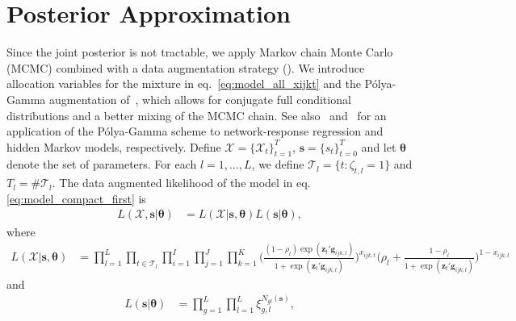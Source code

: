 \documentclass[12pt,a4paper]{article}
\theoremstyle{custom}
\begin{document}
\section{Posterior Approximation} \label{sec:posterior_approx}
Since the joint posterior is not tractable, we apply Markov chain Monte Carlo (MCMC) combined with a data augmentation strategy (\cite{Tanner87DataAugmentation}). We introduce allocation variables for the mixture in eq.~\eqref{eq:model_all_xijkt} and the P\'olya-Gamma augmentation of~\cite{Polsonetal13PolyaGamma}, which allows for conjugate full conditional distributions and a better mixing of the MCMC chain.
See also~\cite{WangDuranteDunson17BayesLogitNetwork} and~\cite{Holsclaw17PolyaGamma_NotHomogMarkovmodel} for an application of the P\'olya-Gamma scheme to network-response regression and hidden Markov models, respectively.
Define $\boldsymbol{\mathcal{X}} = \lbrace \mathcal{X}_t \rbrace_{t=1}^T$, $\mathbf{s} = \lbrace s_t \rbrace_{t=0}^T$ and let $\boldsymbol{\theta}$ denote the set of parameters. For each $l=1,\ldots,L$, we define $\mathcal{T}_l = \lbrace t : \zeta_{t,l}=1 \rbrace$ and $T_l = \#\mathcal{T}_l$.
The data augmented likelihood of the model in eq. \eqref{eq:model_compact_first} is
\begin{align}
L(\boldsymbol{\mathcal{X}},\mathbf{s}|\boldsymbol{\theta}) & = L(\boldsymbol{\mathcal{X}}|\mathbf{s}, \boldsymbol{\theta}) L(\mathbf{s} | \boldsymbol{\theta}),
\label{eq:likelihood_X_y_state_1}
\end{align}
where
\begin{align}
L(\boldsymbol{\mathcal{X}} | \mathbf{s},\boldsymbol{\theta}) & = \prod_{l=1}^L \prod_{t\in \mathcal{T}_l} \prod_{i=1}^I \prod_{j=1}^J \prod_{k=1}^K \bigg( \frac{(1-\rho_l) \exp( \mathbf{z}_t' \mathbf{g}_{ijk,l})}{1+\exp( \mathbf{z}_t' \mathbf{g}_{ijk,l})} \bigg)^{x_{ijk,t}} \bigg( \rho_l + \frac{1-\rho_l}{1+\exp( \mathbf{z}_t' \mathbf{g}_{ijk,l})} \bigg)^{1-x_{ijk,t}}
\label{eq:likelihood_X_y_state_2}
\end{align}
and
\begin{align}
L(\mathbf{s}|\boldsymbol{\theta}) & = \prod_{g=1}^L \prod_{l=1}^L \xi_{g,l}^{N_{gl}(\mathbf{s})},
\label{eq:likelihood_X_y_state_3}
\end{align}
\end{document}
